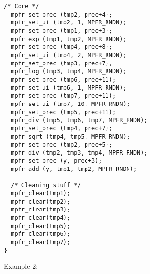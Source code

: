 \begin{center}
\begin{minipage}{15cm}
\begin{Verbatim}[frame=single]
  /* Core */
  mpfr_set_prec (tmp2, prec+4);
  mpfr_set_ui (tmp2, 1, MPFR_RNDN);
  mpfr_set_prec (tmp1, prec+3);
  mpfr_exp (tmp1, tmp2, MPFR_RNDN);
  mpfr_set_prec (tmp4, prec+8);
  mpfr_set_ui (tmp4, 2, MPFR_RNDN);
  mpfr_set_prec (tmp3, prec+7);
  mpfr_log (tmp3, tmp4, MPFR_RNDN);
  mpfr_set_prec (tmp6, prec+11);
  mpfr_set_ui (tmp6, 1, MPFR_RNDN);
  mpfr_set_prec (tmp7, prec+11);
  mpfr_set_ui (tmp7, 10, MPFR_RNDN);
  mpfr_set_prec (tmp5, prec+11);
  mpfr_div (tmp5, tmp6, tmp7, MPFR_RNDN);
  mpfr_set_prec (tmp4, prec+7);
  mpfr_sqrt (tmp4, tmp5, MPFR_RNDN);
  mpfr_set_prec (tmp2, prec+5);
  mpfr_div (tmp2, tmp3, tmp4, MPFR_RNDN);
  mpfr_set_prec (y, prec+3);
  mpfr_add (y, tmp1, tmp2, MPFR_RNDN);

  /* Cleaning stuff */
  mpfr_clear(tmp1);
  mpfr_clear(tmp2);
  mpfr_clear(tmp3);
  mpfr_clear(tmp4);
  mpfr_clear(tmp5);
  mpfr_clear(tmp6);
  mpfr_clear(tmp7);
}
\end{Verbatim}
\end{minipage}\end{center}
\noindent Example 2: 
